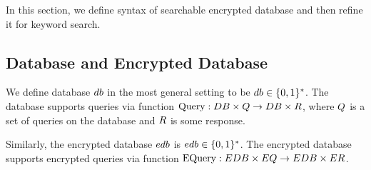 In this section, we define syntax of searchable encrypted database and then refine it for keyword search.


\subsection{Database and Encrypted Database}
We define database $db$ in the most general setting to be $db \in \{0,1\}^{*}$. The database supports queries via function $\text{Query}: DB \times Q \rightarrow DB \times R$, where $Q$ is a set of queries on the database and $R$ is some response. 

Similarly, the encrypted database $edb$ is  $edb \in \{0,1\}^{*}$. The encrypted database supports encrypted queries via function $\text{EQuery}: EDB \times EQ \rightarrow EDB \times ER$. 


